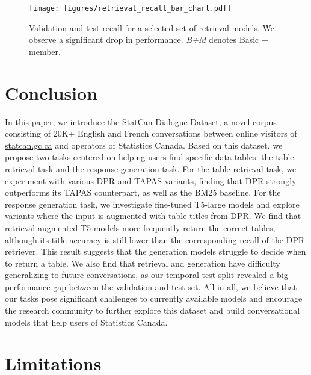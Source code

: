 \documentclass[11pt]{article}
\begin{document}
\begin{figure}[t]
    \small
    \centering
    \texttt{[image: figures/retrieval\_recall\_bar\_chart.pdf]}
    \caption{Validation and test recall for a selected set of retrieval models. We observe a significant drop in performance. \textit{B+M} denotes Basic + member. \vspace{-3mm}}
    \label{fig:valid_vs_test_acc}
\end{figure}
\section{Conclusion}
In this paper, we introduce the StatCan Dialogue Dataset, a novel corpus consisting of 20K+ English and French conversations between online visitors of \href{https://www.statcan.gc.ca/}{statcan.gc.ca} and operators of Statistics Canada. Based on this dataset, we propose two tasks centered on helping users find specific data tables: the table retrieval task and the response generation task. For the table retrieval task, we experiment with various DPR and TAPAS variants, finding that DPR strongly outperforms its TAPAS counterpart, as well as the BM25 baseline. For the response generation task, we investigate fine-tuned T5-large models and explore variants where the input is augmented with table titles from DPR. We find that retrieval-augmented T5 models more frequently return the correct tables, although its title accuracy is still lower than the corresponding recall of the DPR retriever. This result suggests that the generation models struggle to decide when to return a table. We also find that retrieval and generation have difficulty generalizing to future conversations, as our temporal test split revealed a big performance gap between the validation and test set. All in all, we believe that our tasks pose significant challenges to currently available models and encourage the research community to further explore this dataset and build conversational models that help users of Statistics Canada. 



\section*{Limitations}
\label{sec:limitations}
\end{document}
